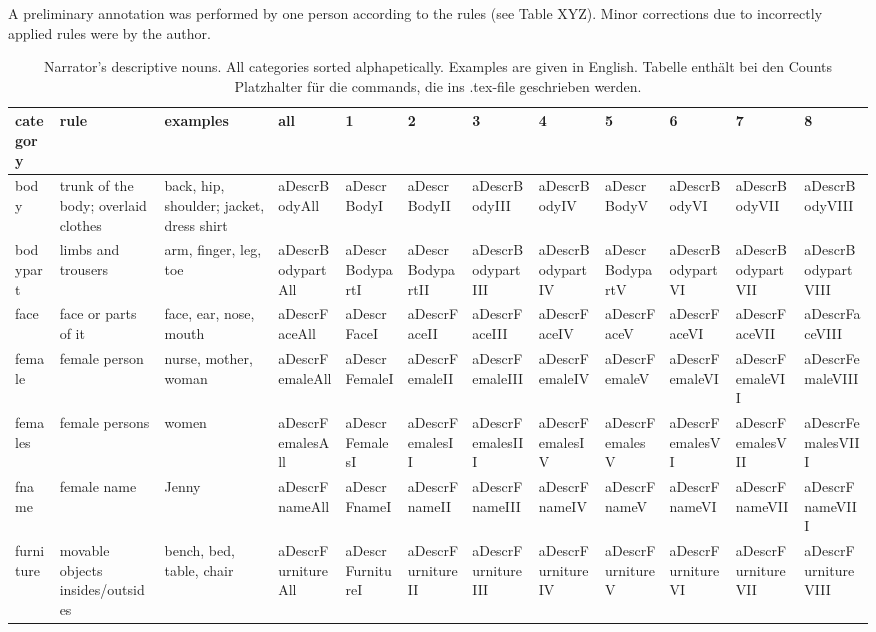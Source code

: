 \documentclass[english]{article}
\begin{document}
A preliminary annotation was performed by one person according to the rules (see Table XYZ).
Minor corrections due to incorrectly applied rules were by the author.

\begin{table}[t]
    \caption{Narrator's descriptive nouns. All categories sorted alphapetically. Examples are given in English. Tabelle enthält bei den Counts Platzhalter für die commands, die ins .tex-file geschrieben werden.}
\label{tab:descr-nouns}
\begin{tabular}{llllllllllll}
\toprule
\textbf{category} & \textbf{rule} & \textbf{examples} & \textbf{all} & \textbf{1} & \textbf{2} & \textbf{3} & \textbf{4} & \textbf{5} & \textbf{6} & \textbf{7} & \textbf{8} \\
\midrule
body & trunk of the body; overlaid clothes & back, hip, shoulder; jacket, dress shirt & aDescrBodyAll & aDescrBodyI & aDescrBodyII & aDescrBodyIII & aDescrBodyIV & aDescrBodyV & aDescrBodyVI & aDescrBodyVII & aDescrBodyVIII \tabularnewline
bodypart & limbs and trousers & arm, finger, leg, toe & aDescrBodypartAll & aDescrBodypartI & aDescrBodypartII & aDescrBodypartIII & aDescrBodypartIV & aDescrBodypartV & aDescrBodypartVI & aDescrBodypartVII & aDescrBodypartVIII \tabularnewline
face & face or parts of it & face, ear, nose, mouth & aDescrFaceAll & aDescrFaceI & aDescrFaceII & aDescrFaceIII & aDescrFaceIV & aDescrFaceV & aDescrFaceVI & aDescrFaceVII & aDescrFaceVIII \tabularnewline
female & female person & nurse, mother, woman & aDescrFemaleAll & aDescrFemaleI & aDescrFemaleII & aDescrFemaleIII & aDescrFemaleIV & aDescrFemaleV & aDescrFemaleVI & aDescrFemaleVII & aDescrFemaleVIII \tabularnewline
females & female persons & women & aDescrFemalesAll & aDescrFemalesI & aDescrFemalesII & aDescrFemalesIII & aDescrFemalesIV & aDescrFemalesV & aDescrFemalesVI & aDescrFemalesVII & aDescrFemalesVIII \tabularnewline
fname & female name & Jenny & aDescrFnameAll & aDescrFnameI & aDescrFnameII & aDescrFnameIII & aDescrFnameIV & aDescrFnameV & aDescrFnameVI & aDescrFnameVII & aDescrFnameVIII \tabularnewline
furniture & movable objects insides/outsides & bench, bed, table, chair & aDescrFurnitureAll & aDescrFurnitureI & aDescrFurnitureII & aDescrFurnitureIII & aDescrFurnitureIV & aDescrFurnitureV & aDescrFurnitureVI & aDescrFurnitureVII & aDescrFurnitureVIII \tabularnewline

\end{tabular}
\end{table}
\end{document}
